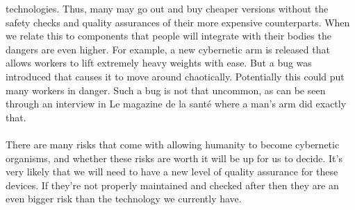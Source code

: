 \documentclass[12pt,a4paper,notitlepage]{article}
\begin{document}
technologies. Thus, many may go out and buy cheaper versions without the safety
checks and quality assurances of their more expensive counterparts. When we
relate this to components that people will integrate with their bodies the
dangers are even higher. For example, a new cybernetic arm is released that
allows workers to lift extremely heavy weights with ease. But a bug was
introduced that causes it to move around chaotically. Potentially this could put
many workers in danger. Such a bug is not that uncommon, as can be seen through
an interview in Le magazine de la sant\'{e} where a man's arm did exactly that. 
\\\\
There are many risks that come with allowing humanity to become cybernetic
organisms, and whether these risks are worth it will be up for us to decide.
It's very likely that we will need to have a new level of quality assurance for
these devices. If they're not properly maintained and checked after then they
are an even bigger risk than the technology we currently have.
\\
\end{document}
